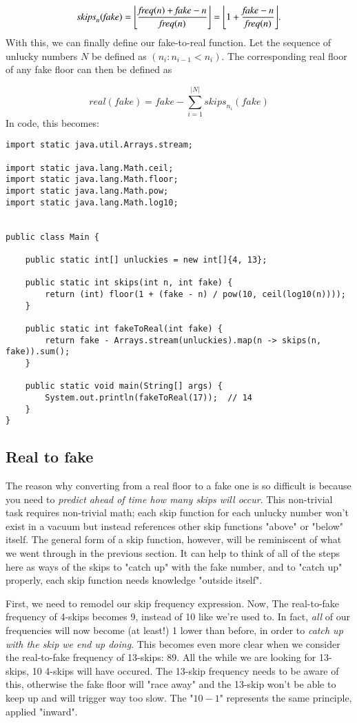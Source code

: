\documentclass{article}
\DeclarePairedDelimiter\floor{\lfloor}{\rfloor}
\begin{document}
\[\mathit{skips}_n(\mathit{fake}) = \floor[\Bigg]{\frac{\mathit{freq}(n) + \mathit{fake} - n}{\mathit{freq}(n)}} = \floor[\Bigg]{1 + \frac{\mathit{fake} - n}{\mathit{freq}(n)}}. \]
With this, we can finally define our fake-to-real function. Let the sequence of unlucky numbers $N$ be defined as $(n_i : n_{i - 1} < n_i)$. The corresponding real floor of any fake floor can then be defined as 

\[\mathit{real}(\mathit{fake}) = \mathit{fake} - \sum_{i=1}^{|N|} \mathit{skips}_{n_i}(\mathit{fake}) \]
In code, this becomes:


\begin{lstlisting}
import static java.util.Arrays.stream;

import static java.lang.Math.ceil;
import static java.lang.Math.floor;
import static java.lang.Math.pow;
import static java.lang.Math.log10;


public class Main {

    public static int[] unluckies = new int[]{4, 13};

    public static int skips(int n, int fake) {
        return (int) floor(1 + (fake - n) / pow(10, ceil(log10(n))));
    }

    public static int fakeToReal(int fake) {
        return fake - Arrays.stream(unluckies).map(n -> skips(n, fake)).sum();
    }

    public static void main(String[] args) {
        System.out.println(fakeToReal(17));  // 14
    }
}
\end{lstlisting}

\subsection{Real to fake}
The reason why converting from a real floor to a fake one is so difficult is because you need to \textit{predict ahead of time how many skips will occur}. This non-trivial task requires non-trivial math; each skip function for each unlucky number won't exist in a vacuum but instead references other skip functions "above" or "below" itself. The general form of a skip function, however, will be reminiscent of what we went through in the previous section. It can help to think of all of the steps here as ways of the skips to "catch up" with the fake number, and to "catch up" properly, each skip function needs knowledge "outside itself".

First, we need to remodel our skip frequency expression. Now, The real-to-fake frequency of 4-skips becomes 9, instead of 10 like we're used to. In fact, \textit{all} of our frequencies will now become (at least!) 1 lower than before, in order to \textit{catch up with the skip we end up doing}. This becomes even more clear when we consider the real-to-fake frequency of 13-skips: 89. All the while we are looking for 13-skips, 10 4-skips will have occured. The 13-skip frequency needs to be aware of this, otherwise the fake floor will "race away" and the 13-skip won't be able to keep up and will trigger way too slow. The "$10 - 1$" represents the same principle, applied "inward". 
\end{document}
